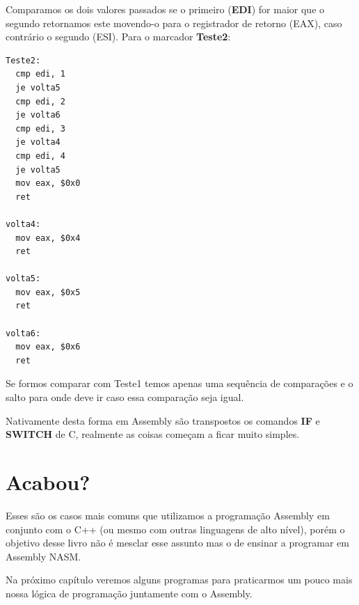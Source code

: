 Comparamos os dois valores passados se o primeiro (\textbf{EDI}) for maior que o segundo retornamos este movendo-o para o registrador de retorno (EAX), caso contrário o segundo (ESI). Para o marcador \textbf{Teste2}:
\begin{lstlisting}[]
Teste2:
  cmp edi, 1
  je volta5
  cmp edi, 2
  je volta6
  cmp edi, 3
  je volta4
  cmp edi, 4
  je volta5
  mov eax, $0x0
  ret

volta4:
  mov eax, $0x4
  ret

volta5:
  mov eax, $0x5
  ret    

volta6:
  mov eax, $0x6
  ret
\end{lstlisting}

Se formos comparar com Teste1 temos apenas uma sequência de comparações e o salto para onde deve ir caso essa comparação seja igual.

Nativamente desta forma em Assembly são transpostos os comandos \textbf{IF} e \textbf{SWITCH} de C, realmente as coisas começam a ficar muito simples.

\section{Acabou?}
Esses são os casos mais comuns que utilizamos a programação Assembly em conjunto com o C++ (ou mesmo com outras linguagens de alto nível), porém o objetivo desse livro não é mesclar esse assunto mas o de ensinar a programar em Assembly NASM.

Na próximo capítulo veremos alguns programas para praticarmos um pouco mais nossa lógica de programação juntamente com o Assembly.

\clearpage